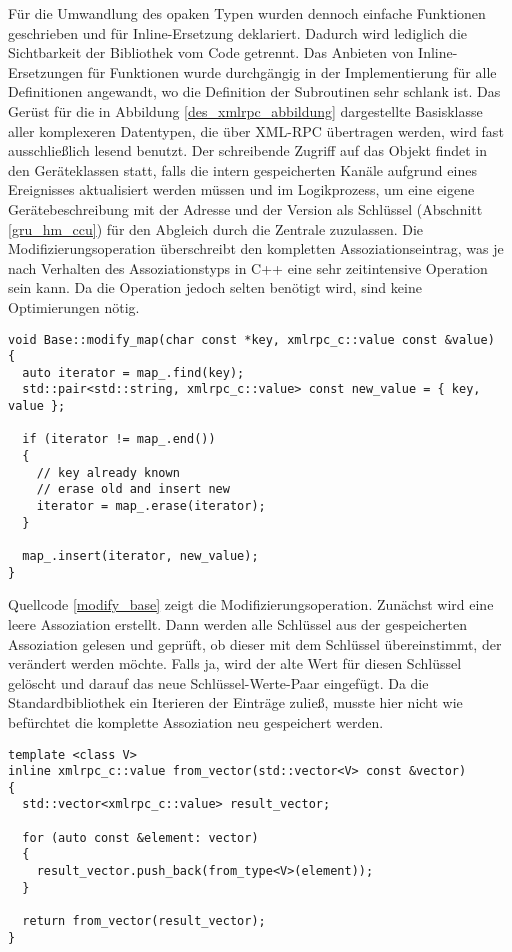 Für die Umwandlung des opaken Typen wurden dennoch einfache Funktionen geschrieben und für
Inline-Ersetzung deklariert.
Dadurch wird lediglich die Sichtbarkeit der Bibliothek vom Code getrennt.
Das Anbieten von Inline-Ersetzungen für Funktionen wurde durchgängig in der Implementierung für alle
Definitionen angewandt, wo die Definition der Subroutinen sehr schlank ist.
Das Gerüst für die in Abbildung \ref{des_xmlrpc_abbildung} dargestellte Basisklasse aller komplexeren
Datentypen, die über XML-RPC übertragen werden, wird fast ausschließlich lesend benutzt.
Der schreibende Zugriff auf das Objekt findet in den Geräteklassen statt, falls die intern
gespeicherten Kanäle aufgrund eines Ereignisses aktualisiert werden müssen und im Logikprozess,
um eine eigene Gerätebeschreibung mit der Adresse und der Version als Schlüssel (Abschnitt \ref{gru_hm_ccu})
für den Abgleich durch die Zentrale zuzulassen.
Die Modifizierungsoperation überschreibt den kompletten Assoziationseintrag, was je nach Verhalten
des Assoziationstyps in C++ eine sehr zeitintensive Operation sein kann.
Da die Operation jedoch selten benötigt wird, sind keine Optimierungen nötig.

\lstset{language=C++}
\begin{lstlisting}[frame=single,caption={Modifizieren eines Basisobjekts für die Übertragung mit XML-RPC},label=modify_base]
void Base::modify_map(char const *key, xmlrpc_c::value const &value)
{
  auto iterator = map_.find(key);
  std::pair<std::string, xmlrpc_c::value> const new_value = { key, value };

  if (iterator != map_.end())
  {
    // key already known
    // erase old and insert new
    iterator = map_.erase(iterator);
  }

  map_.insert(iterator, new_value);
}
\end{lstlisting}

Quellcode \ref{modify_base} zeigt die Modifizierungsoperation.
Zunächst wird eine leere Assoziation erstellt.
Dann werden alle Schlüssel aus der gespeicherten Assoziation gelesen und geprüft, ob dieser mit dem
Schlüssel übereinstimmt, der verändert werden möchte.
Falls ja, wird der alte Wert für diesen Schlüssel gelöscht und darauf das neue Schlüssel-Werte-Paar
eingefügt.
Da die Standardbibliothek ein Iterieren der Einträge zuließ, musste hier nicht wie befürchtet die
komplette Assoziation neu gespeichert werden.

\lstset{language=C++}
\begin{lstlisting}[frame=single,caption={Umwandung eines C++-Vektors in einein opaken XML-RPC-Typ},label=conv_from]
template <class V>
inline xmlrpc_c::value from_vector(std::vector<V> const &vector)
{
  std::vector<xmlrpc_c::value> result_vector;

  for (auto const &element: vector)
  {
    result_vector.push_back(from_type<V>(element));
  }

  return from_vector(result_vector);
}
\end{lstlisting}

